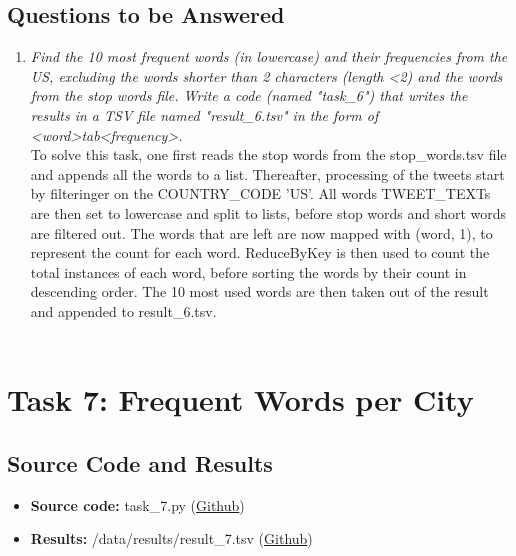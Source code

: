 \documentclass{article}
\begin{document}
\subsection*{Questions to be Answered}
\begin{enumerate}[label=\alph*)]
    \item \textit{Find the 10 most frequent words (in lowercase) and their frequencies from the US, excluding the words shorter than 2 characters (length \textless 2) and the words from the stop words file. Write a code (named "task\_6") that writes the results in a TSV file named "result\_6.tsv" in the form of \textless word\textgreater tab\textless frequency\textgreater.}\\
    
    To solve this task, one first reads the stop words from the stop\_words.tsv file and appends all the words to a list. Thereafter, processing of the tweets start by filteringer on the COUNTRY\_CODE 'US'. All words TWEET\_TEXTs are then set to lowercase and split to lists, before stop words and short words are filtered out. The words that are left are now mapped with (word, 1), to represent the count for each word. ReduceByKey is then used to count the total instances of each word, before sorting the words by their count in descending order. The 10 most used words are then taken out of the result and appended to result\_6.tsv.\\ \\
\end{enumerate}


\section*{Task 7: Frequent Words per City}
\subsection*{Source Code and Results}
    \begin{itemize}
        \item \textbf{Source code:} task\_7.py (\href{https://github.com/FredrikBakken/TDT4305_Big-Data-Project/blob/master/PhaseOne/task_7.py}{Github})
        \item \textbf{Results:} /data/results/result\_7.tsv (\href{https://github.com/FredrikBakken/TDT4305_Big-Data-Project/blob/master/PhaseOne/data/results/result_7.tsv}{Github})
    \end{itemize}
\end{document}
